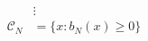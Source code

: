 \documentclass[preview]{standalone}
\begin{document}
\begin{align*}
&\vdots\\ \mathcal{C}_N &= \{ x : b_N(x) \geq 0 \}
\end{align*}
\end{document}
